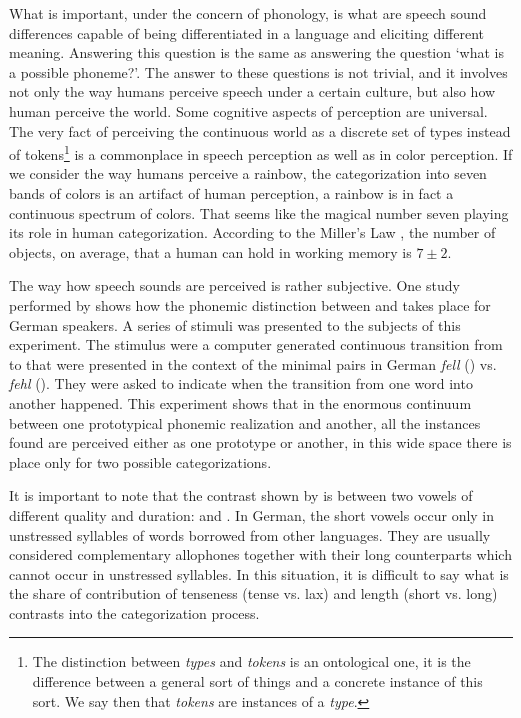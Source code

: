 What is important, under the concern of phonology, is what are speech sound differences capable of being differentiated in a language and eliciting different meaning. Answering this question is the same as answering the question `what is a possible phoneme?'. The answer to these questions is not trivial, and it involves not only the way humans perceive speech under a certain culture, but also how human perceive the world. Some cognitive aspects of perception are universal. The very fact of perceiving the continuous world as a discrete set of types instead of tokens\footnote{The distinction between \textit{types} and \textit{tokens} is an ontological one, it is the difference between a general sort of things and a concrete instance of this sort. We say then that \textit{tokens} are instances of a \textit{type}.} is a commonplace in speech perception as well as in color perception. If we consider the way humans perceive a rainbow, the categorization into seven bands of colors is an artifact of human perception, a rainbow is in fact a continuous spectrum of colors. That seems like the magical number seven playing its role in human categorization. According to the Miller's Law \citep{miller1956}, the number of objects, on average, that a human can hold in working memory is $7 \pm 2$.

The way how speech sounds are perceived is rather subjective. One study performed by \cite{laboissiere2010} shows how the phonemic distinction between  and  takes place for German speakers. A series of stimuli was presented to the subjects of this experiment. The stimulus were a computer generated continuous transition from \textipa{[e]} to \textipa{[E]} that were presented in the context of the minimal pairs in German \textit{fell} (\textipa{[fEl]}) vs. \textit{fehl} (\textipa{[fe:l]}). They were asked to indicate when the transition from one word into another happened. This experiment shows that in the enormous continuum between one prototypical phonemic realization and another, all the instances found are perceived either as one prototype or another, in this wide space there is place only for two possible categorizations.

It is important to note that the contrast shown by \cite{laboissiere2010} is between two vowels of different quality and duration: \textipa{[e:]} and \textipa{[E]}. In German, the short vowels \textipa{[i, y, u, e, \o, o]} occur only in unstressed syllables of words borrowed from other languages. They are usually considered complementary allophones together with their long counterparts which cannot occur in unstressed syllables. In this situation, it is difficult to say what is the share of contribution of tenseness (tense vs. lax) and length (short vs. long) contrasts into the categorization process.

